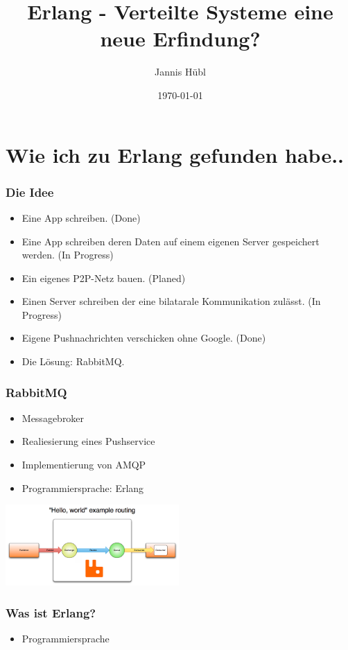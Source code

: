 \documentclass{beamer}
\title{Erlang - Verteilte Systeme eine neue Erfindung?}
\author{Jannis Hübl}
\date{\today}
\begin{document}
\maketitle
\frame{\tableofcontents[currentsection]}
 
\section{Wie ich zu Erlang gefunden habe..}
\begin{frame} %
  \frametitle{Die Idee} %
  \begin{itemize} %
     \item Eine App schreiben. (Done)
     \item Eine App schreiben deren Daten auf einem eigenen Server gespeichert werden. (In Progress)
     \item Ein eigenes P2P-Netz bauen. (Planed) 
     \item Einen Server schreiben der eine bilatarale Kommunikation zulässt. (In Progress)
     \item Eigene Pushnachrichten verschicken ohne Google. (Done)
     \item Die Lösung: RabbitMQ.
  \end{itemize}
\end{frame}

\begin{frame} %
  \frametitle{RabbitMQ} %
  \begin{itemize} %
    \item Messagebroker
    \item Realiesierung eines Pushservice
    \item Implementierung von AMQP 
    \item Programmiersprache: Erlang
  \end{itemize}
  \includegraphics[width=250px]{img/example-routing}
\end{frame}


\begin{frame} %
  \frametitle{Was ist Erlang?} %
  \begin{itemize} %
    \item Programmiersprache
  \end{itemize}
\end{frame}
\end{document}
